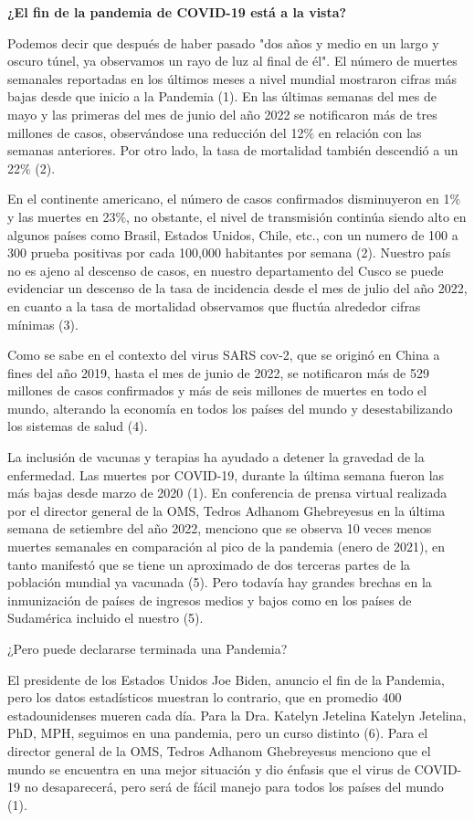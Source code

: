 \documentclass[12pt,a4paper,openany]{book}
\begin{document}
	\noindent \textbf{¿El fin de la pandemia de COVID-19 está a la vista?}
		

Podemos decir que después de haber pasado "dos años y medio en un largo y oscuro túnel, ya observamos un rayo de luz al final de él". El número de muertes semanales reportadas en los últimos meses a nivel mundial mostraron cifras más bajas desde que inicio a la Pandemia (1).  En las últimas semanas del mes de mayo y las primeras del mes de junio del año 2022 se notificaron más de tres millones de casos, observándose una reducción del 12$\%$ en relación con las semanas anteriores. Por otro lado, la tasa de mortalidad también descendió a un 22$\%$ (2).

En el continente americano, el número de casos confirmados disminuyeron en 1$\%$ y las muertes en 23$\%$, no obstante, el nivel de transmisión continúa siendo alto en algunos países como Brasil, Estados Unidos, Chile, etc., con un numero de 100 a 300 prueba positivas por cada 100,000 habitantes por semana (2).  Nuestro país no es ajeno al descenso de casos, en nuestro departamento del Cusco se puede evidenciar un descenso de la tasa de incidencia desde el mes de julio del año 2022, en cuanto a la tasa de mortalidad observamos que fluctúa alrededor cifras mínimas (3).

Como se sabe en el contexto del virus SARS cov-2, que se originó en China a fines del año 2019, hasta el mes de junio de 2022, se notificaron más de 529 millones de casos confirmados y más de seis millones de muertes en todo el mundo, alterando la economía en todos los países del mundo y desestabilizando los sistemas de salud (4).

La inclusión de vacunas y terapias ha ayudado a detener la gravedad de la enfermedad. Las muertes por COVID-19, durante la última semana fueron las más bajas desde marzo de 2020 (1). En conferencia de prensa virtual realizada por el director general de la OMS, Tedros Adhanom Ghebreyesus en la última semana de setiembre del año 2022, menciono que se observa 10 veces menos muertes semanales en comparación al pico de la pandemia (enero de 2021), en tanto manifestó que se tiene un aproximado de dos terceras partes de la población mundial ya vacunada (5). Pero todavía hay grandes brechas en la inmunización de países de ingresos medios y bajos como en los países de Sudamérica incluido el nuestro (5).

¿Pero puede declararse terminada una Pandemia?

 El presidente de los Estados Unidos Joe Biden, anuncio el fin de la Pandemia, pero los datos estadísticos muestran lo contrario, que en promedio 400 estadounidenses mueren cada día. Para la Dra. Katelyn Jetelina Katelyn Jetelina, PhD, MPH, seguimos en una pandemia, pero un curso distinto (6). Para el director general de la OMS, Tedros Adhanom Ghebreyesus menciono que el mundo se encuentra en una mejor situación y dio énfasis que el virus de COVID-19 no desaparecerá, pero será de fácil manejo para todos los países del mundo (1).
 
\end{document}
